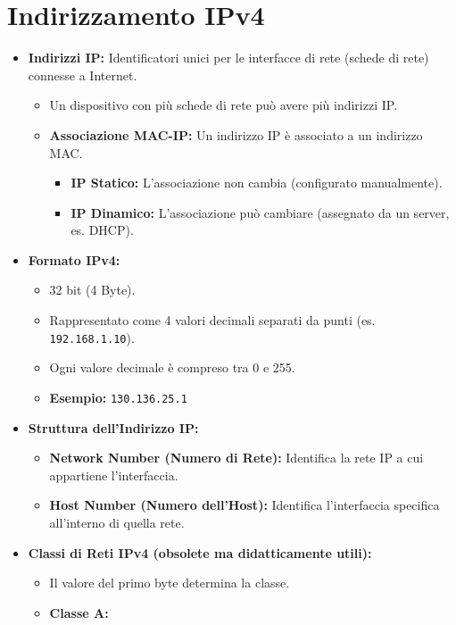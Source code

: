 \section{Indirizzamento IPv4}
\begin{itemize}
    \item \textbf{Indirizzi IP:} Identificatori unici per le interfacce di rete (schede di rete) connesse a Internet.
    \begin{itemize}
        \item Un dispositivo con più schede di rete può avere più indirizzi IP.
        \item \textbf{Associazione MAC-IP:} Un indirizzo IP è associato a un indirizzo MAC.
        \begin{itemize}
            \item \textbf{IP Statico:} L'associazione non cambia (configurato manualmente).
            \item \textbf{IP Dinamico:} L'associazione può cambiare (assegnato da un server, es. DHCP).
        \end{itemize}
    \end{itemize}
    \item \textbf{Formato IPv4:}
    \begin{itemize}
        \item 32 bit (4 Byte).
        \item Rappresentato come 4 valori decimali separati da punti (es. \texttt{192.168.1.10}).
        \item Ogni valore decimale è compreso tra 0 e 255.
        \item \textbf{Esempio:} \texttt{130.136.25.1}
    \end{itemize}
    \item \textbf{Struttura dell'Indirizzo IP:}
    \begin{itemize}
        \item \textbf{Network Number (Numero di Rete):} Identifica la rete IP a cui appartiene l'interfaccia.
        \item \textbf{Host Number (Numero dell'Host):} Identifica l'interfaccia specifica all'interno di quella rete.
    \end{itemize}
    \item \textbf{Classi di Reti IPv4 (obsolete ma didatticamente utili):}
    \begin{itemize}
        \item Il valore del primo byte determina la classe.
        \item \textbf{Classe A:}

\end{itemize}
\end{itemize}
